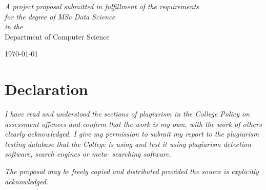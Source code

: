 \documentclass[12pt, twoside, a4paper]{article}
\begin{document}
\begin{titlepage}
\begin{center}
            \large \textit{A project proposal submitted in fulfillment of the requirements\\ for the degree of MSc Data Science}\\[0.3cm] %
            \textit{in the}\\[0.4cm]
            Department of Computer Science\\[2cm] %
 
            \vfill

            {\large \today}\\[4cm] %
 
            \vfill
    \end{center}
\end{titlepage}    
\thispagestyle{empty}
\cleardoublepage


\section*{Declaration}

\vfill
\textit{I have read and understood the sections of plagiarism in the College Policy on assessment offences and confirm that the work is my own, with the work of others clearly acknowledged. I give my permission to submit my report to the plagiarism testing database that the College is using and test it using plagiarism detection software, search engines or meta- searching software.}

\textit{The proposal may be freely copied and distributed provided the source is explicitly acknowledged.}
\vfill

\clearpage
\end{document}

